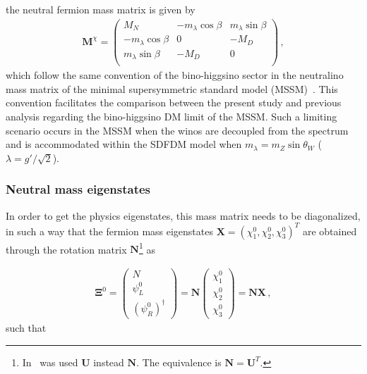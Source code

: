 the neutral fermion mass matrix is given by
\begin{align}
\label{eq:Mchi}
  \mathbf{M}^{\chi}=\begin{pmatrix}
 M_N                 &-m_{\lambda}\cos\beta&m_{\lambda}\sin\beta\\
-m_{\lambda}\cos\beta &  0                  & -M_D\\
m_{\lambda}\sin\beta&  -M_D                &  0  \\
\end{pmatrix}\,,
\end{align}
%
which follow the same
convention of the bino-higgsino sector in the neutralino mass matrix of the
minimal supersymmetric standard model (MSSM)~\cite{Martin:2012us}. 
This convention facilitates the comparison between the present study and previous analysis
regarding the bino-higgsino DM limit of the MSSM. 
Such a limiting scenario occurs in the MSSM when the winos are decoupled from the spectrum and is accommodated within the SDFDM model when
$m_\lambda=m_Z\sin\theta_W$ ($\lambda=g'/\sqrt{2}$).










\subsubsection{Neutral mass eigenstates}
In order to get the physics eigenstates, this mass matrix needs to be diagonalized,
in such a way that the fermion mass eigenstates $\mathbf{X}=(\chi_1^0,\chi_2^0,\chi_3^0)^T$ are obtained through the rotation
matrix $\mathbf{N}$\footnote{In~\cite{Horiuchi:2016tqw} was used $\mathbf{U}$ instead $\mathbf{N}$. The equivalence is $\mathbf{N}=\mathbf{U}^T$.} as 

\begin{align}
\label{eq:rotation}
\boldsymbol{\Xi}^0 = \begin{pmatrix}N\\ \psi_L^0 \\ (\psi_R^0)^\dagger\end{pmatrix}= 
\mathbf{N}\begin{pmatrix}\chi_1^0\\ \chi_2^0 \\ \chi_3^0\end{pmatrix}= \mathbf{N}\mathbf{X} \,,
\end{align}
such that


